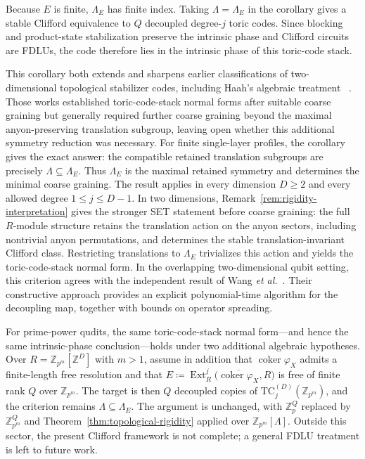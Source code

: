 \documentclass[aps,prx,english,superscriptaddress,twocolumn,tightenlines,showpacs,longbibliography,floatfix,amsfonts]{revtex4-2}
\theoremstyle{remark}
\theoremstyle{definition}
\begin{document}
Because \(E\) is finite, \(\Lambda_E\) has finite index. Taking
\(\Lambda=\Lambda_E\) in the corollary gives a stable Clifford equivalence
to \(Q\) decoupled degree-\(j\) toric codes. Since blocking and product-state
stabilization preserve the intrinsic phase and Clifford circuits are FDLUs,
the code therefore lies in the intrinsic phase of this toric-code stack.

This corollary both extends and sharpens
earlier classifications of two-dimensional topological stabilizer codes,
including Haah's algebraic treatment
~\cite{Bombin2012Universal,Bombin2014Structure,
Haah2016Algebraic,Haah2021Classification}. Those works established
toric-code-stack normal forms after suitable coarse graining but generally
required further coarse graining beyond the maximal anyon-preserving
translation subgroup, leaving open whether this additional symmetry reduction
was necessary. For finite single-layer profiles, the corollary gives the
exact answer: the compatible retained translation subgroups are precisely
\(\Lambda\subseteq\Lambda_E\). Thus \(\Lambda_E\) is the maximal retained
symmetry and determines the minimal coarse graining. The result applies in
every dimension \(D\geq2\) and every allowed degree
\(1\leq j\leq D-1\). In two dimensions,
Remark~\ref{rem:rigidity-interpretation} gives the stronger
SET statement before coarse graining: the full \(R\)-module
structure retains the translation action on the anyon sectors, including
nontrivial anyon permutations, and determines the stable
translation-invariant Clifford class. Restricting translations to
\(\Lambda_E\) trivializes this action and yields the toric-code-stack normal
form. In the overlapping two-dimensional qubit setting, this criterion agrees
with the independent result of Wang \emph{et al.}~\cite{Wang2026Decoupling}.
Their constructive approach provides an explicit polynomial-time algorithm
for the decoupling map, together with bounds on operator spreading.

For prime-power qudits, the same toric-code-stack normal form---and hence the
same intrinsic-phase conclusion---holds under two additional algebraic
hypotheses. Over \(R=\mathbb Z_{p^m}[\mathbb Z^D]\) with \(m>1\), assume in
addition that \(\operatorname{coker}\varphi_X\) admits a finite-length free
resolution and that
\(
	E\coloneqq
	\operatorname{Ext}_R^j
	\bigl(\overline{\operatorname{coker}\varphi_X},R\bigr)
\)
is free of finite rank \(Q\) over \(\mathbb Z_{p^m}\). The target is then
\(Q\) decoupled copies of
\(\mathrm{TC}_j^{(D)}(\mathbb Z_{p^m})\), and the criterion remains
\(\Lambda\subseteq\Lambda_E\). The argument is unchanged, with
\(\mathbb Z_p^Q\) replaced by \(\mathbb Z_{p^m}^Q\) and
Theorem~\ref{thm:topological-rigidity} applied over
\(\mathbb Z_{p^m}[\Lambda]\). Outside this sector, the present Clifford
framework is not complete; a general FDLU treatment is left to future work.
\end{document}
